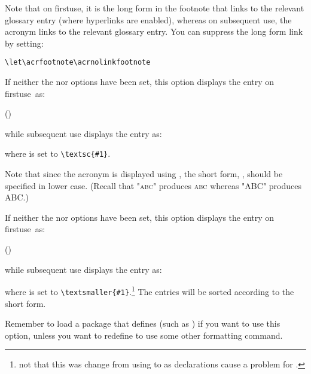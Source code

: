 \documentclass[report]{nlctdoc}
\newcommand*{\firstuse}{\gls{firstuse}}
\begin{document}
\begin{description}
Note that on \firstuse, it is the long form in the footnote that
links to the relevant glossary entry (where hyperlinks are enabled),
whereas on subsequent use, the acronym links to the relevant
glossary entry. You can suppress the long form link by setting:
\begin{verbatim}
\let\acrfootnote\acrnolinkfootnote
\end{verbatim}

\item[\pkgopt{smallcaps}]\ifpdf\mbox{}\par\fi
If neither the  nor  options
have been set, this option displays the entry on \firstuse\ as:
\begin{display}
 ()
\end{display}
while subsequent use displays the entry as:
\begin{display}
\end{display}
where  is set to \verb|\textsc{#1}|.

\begin{important}
Note that since the acronym is displayed using , 
the short form, , should be specified in lower case.
\ifpdf(Recall that "\textsc{abc}" produces \textsc{abc} whereas 
"\textsc{ABC}" produces \textsc{ABC}.)\fi
\end{important}

\item[\pkgopt{smaller}]\ifpdf\mbox{}\par\fi
If neither the  nor  options
have been set, this option displays the entry on \firstuse\ as:
\begin{display}
 ()
\end{display}
while subsequent use displays the entry as:
\begin{display}
\end{display}
where  is set to 
\verb|\textsmaller{#1}|.\footnote{not that this was change from 
using  to  as declarations
cause a problem for .}
The entries will be sorted according to the short form.

\begin{important}
Remember to load a package that defines  (such as
) if you want to use this option, unless you want
to redefine  to use some other formatting command.
\end{important}


\end{description}
\end{document}
